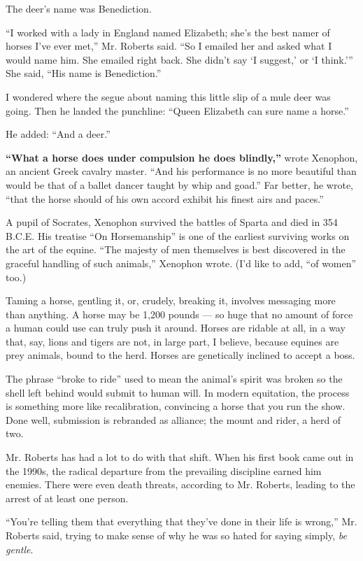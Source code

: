The deer's name was Benediction.

``I worked with a lady in England named Elizabeth; she's the best namer
of horses I've ever met,'' Mr. Roberts said. ``So I emailed her and
asked what I would name him. She emailed right back. She didn't say `I
suggest,' or `I think.''' She said, ``His name is Benediction.''

I wondered where the segue about naming this little slip of a mule deer
was going. Then he landed the punchline: ``Queen Elizabeth can sure name
a horse.''

He added: ``And a deer.''

\textbf{``What a horse does under compulsion he does blindly,''} wrote
Xenophon, an ancient Greek cavalry master. ``And his performance is no
more beautiful than would be that of a ballet dancer taught by whip and
goad.'' Far better, he wrote, ``that the horse should of his own accord
exhibit his finest airs and paces.''

A pupil of Socrates, Xenophon survived the battles of Sparta and died in
354 B.C.E. His treatise ``On Horsemanship'' is one of the earliest
surviving works on the art of the equine. ``The majesty of men
themselves is best discovered in the graceful handling of such
animals,'' Xenophon wrote. (I'd like to add, ``of women'' too.)

Taming a horse, gentling it, or, crudely, breaking it, involves
messaging more than anything. A horse may be 1,200 pounds --- so huge
that no amount of force a human could use can truly push it around.
Horses are ridable at all, in a way that, say, lions and tigers are not,
in large part, I believe, because equines are prey animals, bound to the
herd. Horses are genetically inclined to accept a boss.

The phrase ``broke to ride'' used to mean the animal's spirit was broken
so the shell left behind would submit to human will. In modern
equitation, the process is something more like recalibration, convincing
a horse that you run the show. Done well, submission is rebranded as
alliance; the mount and rider, a herd of two.

Mr. Roberts has had a lot to do with that shift. When his first book
came out in the 1990s, the radical departure from the prevailing
discipline earned him enemies. There were even death threats, according
to Mr. Roberts, leading to the arrest of at least one person.

``You're telling them that everything that they've done in their life is
wrong,'' Mr. Roberts said, trying to make sense of why he was so hated
for saying simply, \emph{be gentle}.

